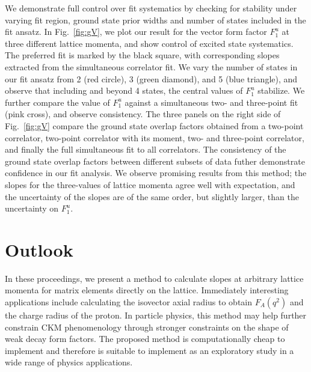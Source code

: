 \documentclass{PoS}
\begin{document}
We demonstrate full control over fit systematics by checking for stability under varying fit region, ground state prior widths and number of states included in the fit ansatz. In Fig.~\ref{fig:gV}, we plot our result for the vector form factor $F^u_1$ at three different lattice momenta, and show control of excited state systematics.  The preferred fit is marked by the black square, with corresponding slopes extracted from the simultaneous correlator fit. We vary the number of states in our fit ansatz from 2 (red circle), 3 (green diamond), and 5 (blue triangle), and observe that including and beyond 4 states, the central values of $F_1^u$ stabilize. We further compare the value of $F_1^u$ against a simultaneous two- and three-point fit (pink cross), and observe consistency. The three panels on the right side of Fig.~\ref{fig:gV} compare the ground state overlap factors obtained from a two-point correlator, two-point correlator with its moment, two- and three-point correlator, and finally the full simultaneous fit to all correlators.  The consistency of the ground state overlap factors between different subsets of data futher demonstrate confidence in our fit analysis. We observe promising results from this method; the slopes for the three-values of lattice momenta agree well with expectation, and the uncertainty of the slopes are of the same order, but slightly larger, than the uncertainty on $F_1^u$.

\section{Outlook}
In these proceedings, we present a method to calculate slopes at arbitrary lattice momenta for matrix elements directly on the lattice.  Immediately interesting applications include calculating the isovector axial radius to obtain $F_A(q^2)$ and the charge radius of the proton.  In particle physics, this method may help further constrain CKM phenomenology through stronger constraints on the shape of weak decay form factors. The proposed method is computationally cheap to implement and therefore is suitable to implement as an exploratory study in a wide range of physics applications.

\end{document}
